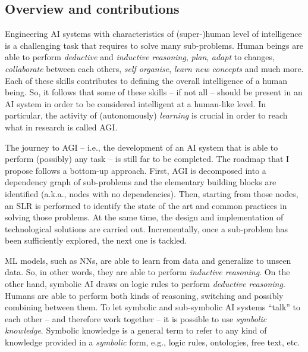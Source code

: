 \begin{refsection}
\section{Overview and contributions}
\label{sec:overview-and-contributions}
%
Engineering \ac{AI} systems with characteristics of (super-)human level of intelligence is a challenging task that requires to solve many sub-problems.
%
Human beings are able to perform \emph{deductive} and \emph{inductive reasoning}, \emph{plan}, \emph{adapt} to changes, \emph{collaborate} between each others, \emph{self organise}, \emph{learn new concepts} and much more.
%
Each of these skills contributes to defining the overall intelligence of a human being.
%
So, it follows that some of these skills -- if not all -- should be present in an \ac{AI} system in order to be considered intelligent at a human-like level.
%
In particular, the activity of (autonomously) \emph{learning} is crucial in order to reach what in research is called \ac{AGI}.


The journey to \ac{AGI} -- i.e., the development of an \ac{AI} system that is able to perform (possibly) any task -- is still far to be completed.
%
The roadmap that I propose follows a bottom-up approach.
%
%
First, \ac{AGI} is decomposed into a dependency graph of sub-problems and the elementary building blocks are identified (a.k.a., nodes with no dependencies).
%
Then, starting from those nodes, an \ac{SLR} is performed to identify the state of the art and common practices in solving those problems.
%
At the same time, the design and implementation of technological solutions are carried out.
%
Incrementally, once a sub-problem has been sufficiently explored, the next one is tackled.


\Ac{ML} models, such as \acp{NN}, are able to learn from data and generalize to unseen data.
%
So, in other words, they are able to perform \emph{inductive reasoning}.
%
On the other hand, symbolic \ac{AI} draws on logic rules to perform \emph{deductive reasoning}.
%
Humans are able to perform both kinds of reasoning, switching and possibly combining between them.
%
To let symbolic and sub-symbolic \ac{AI} systems ``talk'' to each other -- and therefore work together -- it is possible to use \emph{symbolic knowledge}.
%
Symbolic knowledge is a general term to refer to any kind of knowledge provided in a \emph{symbolic} form, e.g., logic rules, ontologies, free text, etc.



\end{refsection}
